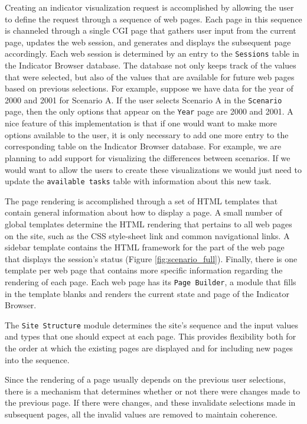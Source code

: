 Creating an indicator visualization request is accomplished by allowing the
user to define the request through a sequence of web pages. Each page in
this sequence is channeled through a single CGI page that gathers user
input from the current page, updates the web session, and generates and
displays the subsequent page accordingly. Each web session is determined by
an entry to the {\tt Sessions} table in the Indicator Browser
database. The database not only keeps track of the values that were
selected, but also of the values that are available for future web pages
based on previous selections. For example, suppose we have data for the
year of 2000 and 2001 for Scenario A\@.  If the user selects Scenario A in the
{\tt Scenario} page, then the only options that appear on the {\tt Year}
page are 2000 and 2001. A nice feature of this implementation is
that if one would want to make more options available to the user, it is
only necessary to add one more entry to the corresponding table on the
Indicator Browser database. For example, we are planning to add support for
visualizing the differences between scenarios. If we would want to
allow the users to create these visualizations we would just need to update
the {\tt available tasks} table with information about this new task.

The page rendering is accomplished through a set of HTML templates that
contain general information about how to display a page. A small number of
global templates determine the HTML rendering that pertains to all web
pages on the site, such as the CSS style-sheet link and common navigational
links.  A sidebar template contains the HTML framework for the part of the
web page that displays the session's status (Figure \ref{fig:scenario_full}).
Finally, there is one template per web page that contains more specific
information regarding the rendering of each page. Each web page has its
{\tt Page Builder}, a module that fills in the template blanks and
renders the current state and page of the Indicator Browser.

The {\tt Site Structure} module determines the site's sequence and the
input values and types that one should expect at each page. This provides
flexibility both for the order at which the existing pages are displayed
and for including new pages into the sequence.

Since the rendering of a page usually depends on the previous user
selections, there is a mechanism that determines whether or not there were
changes made to the previous page. If there were changes, and these
invalidate selections made in subsequent pages, all the invalid values are
removed to maintain coherence.

